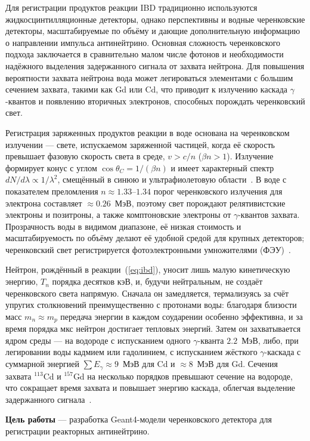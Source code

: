 \documentclass[a4paper,12pt]{extarticle}
\begin{document}
Для регистрации продуктов реакции IBD традиционно используются жидкосцинтилляционные детекторы, однако перспективны и водные черенковские детекторы, масштабируемые по объёму и дающие дополнительную информацию о направлении импульса антинейтрино. Основная сложность черенковского подхода заключается в сравнительно малом числе фотонов и необходимости надёжного выделения задержанного сигнала от захвата нейтрона. Для повышения вероятности захвата нейтрона вода может легироваться элементами с большим сечением захвата, такими как Gd или Cd, что приводит к излучению каскада $\gamma$-квантов и появлению вторичных электронов, способных порождать черенковский свет.

Регистрация заряженных продуктов реакции в воде основана на черенковском излучении — свете, испускаемом заряженной частицей, когда её скорость превышает фазовую скорость света в среде, $v>c/n$ ($\beta n>1$). Излучение формирует конус с углом $\cos\theta_C=1/(\beta n)$ и имеет характерный спектр $dN/d\lambda\propto 1/\lambda^2$, смещённый в синюю и ультрафиолетовую области~\cite{jelley1958}. В воде с показателем преломления $n\approx 1.33$--$1.34$ порог черенковского излучения для электрона составляет $\approx 0.26$~МэВ, поэтому свет порождают релятивистские электроны и позитроны, а также комптоновские электроны от $\gamma$-квантов захвата. Прозрачность воды в видимом диапазоне, её низкая стоимость и масштабируемость по объёму делают её удобной средой для крупных детекторов; черенковский свет регистрируется фотоэлектронными умножителями (ФЭУ)~\cite{jelley1958}.

Нейтрон, рождённый в реакции~(\ref{eq:ibd}), уносит лишь малую кинетическую энергию, $T_n$ порядка десятков кэВ, и, будучи нейтральным, не создаёт черенковского света напрямую. Сначала он замедляется, термализуясь за счёт упругих столкновений преимущественно с протонами воды: благодаря близости масс $m_n\approx m_p$ передача энергии в каждом соударении особенно эффективна, и за время порядка мкс нейтрон достигает тепловых энергий. Затем он захватывается ядром среды — на водороде с испусканием одного $\gamma$-кванта $2.2$~МэВ, либо, при легировании воды кадмием или гадолинием, с испусканием жёсткого $\gamma$-каскада с суммарной энергией $\sum E_\gamma\approx 9$~МэВ для Cd и $\approx 8$~МэВ для Gd. Сечения захвата $^{113}$Cd и $^{157}$Gd на несколько порядков превышают сечение на водороде, что сокращает время захвата и повышает энергию каскада, облегчая выделение задержанного сигнала~\cite{mughabghab2006}.

\textbf{Цель работы} — разработка Geant4-модели черенковского детектора для регистрации реакторных антинейтрино.
\end{document}
